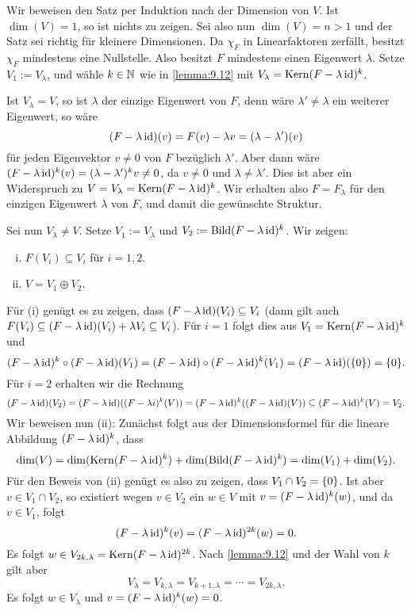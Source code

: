 \begin{beweis}
	Wir beweisen den Satz per Induktion nach der Dimension von $V$.
	Ist $\dim(V) = 1$, so ist nichts zu zeigen.
	Sei also nun $\dim(V) = n > 1$ und der Satz sei richtig für kleinere Dimensionen.
	Da $\chi_F$ in Linearfaktoren zerfällt, besitzt $\chi_F$ mindestens eine Nullstelle.
	Also besitzt $F$ mindestens einen Eigenwert $\lambda$.
	Setze $V_1 := V_\lambda$, und wähle $k \in \mathbb{N}$ wie in \autoref{lemma:9.12} mit $V_\lambda = \operatorname{Kern}(F - \lambda \operatorname{id})^k$.
	
	Ist $V_\lambda = V$, so ist $\lambda$ der einzige Eigenwert von $F$, denn wäre $\lambda' \neq \lambda$ ein weiterer Eigenwert, so wäre
	\[
		(F-\lambda \operatorname{id})(v) = F(v) - \lambda v = (\lambda - \lambda')(v)
	\]
	für jeden Eigenvektor $v \neq 0$ von $F$ bezüglich $\lambda'$.
	Aber dann wäre $(F-\lambda \operatorname{id})^k(v) = (\lambda - \lambda')^kv \neq 0$, da $v \neq 0$ und $\lambda \neq \lambda'$.
	Dies ist aber ein Widerspruch zu $V = V_\lambda = \operatorname{Kern}(F - \lambda \operatorname{id})^k$.
	Wir erhalten also $F = F_\lambda$ für den einzigen Eigenwert $\lambda$ von $F$, und damit die gewünschte Struktur.
	
	Sei nun $V_\lambda \neq V$.
	Setze $V_1 := V_\lambda$ und $V_2 := \operatorname{Bild}(F - \lambda \operatorname{id})^k$.
	Wir zeigen:
	\begin{enumerate}[(i)]
		\item $F(V_i) \subseteq V_i$ für $i = 1,2$.
		\item $V = V_1 \oplus V_2$.
	\end{enumerate}
	Für (i) genügt es zu zeigen, dass $(F - \lambda \operatorname{id})(V_i) \subseteq V_i$ (dann gilt auch $F(V_i) \subseteq (F-\lambda \operatorname{id})(V_i) + \lambda V_i \subseteq V_i$).
	Für $i = 1$ folgt dies aus $V_1 = \operatorname{Kern}(F - \lambda \operatorname{id})^k$ und
	\[
		(F-\lambda \operatorname{id})^k \circ (F-\lambda \operatorname{id})(V_1) = (F - \lambda \operatorname{id}) \circ (F - \lambda \operatorname{id})^k(V_1) = (F - \lambda \operatorname{id})(\{0\}) = \{0\}.
	\]
	Für $i = 2$ erhalten wir die Rechnung
	\[
		(F-\lambda \operatorname{id})(V_2) = (F-\lambda \operatorname{id})((F-\lambda i)^k(V)) = (F - \lambda \operatorname{id})^k((F - \lambda \operatorname{id})(V)) \subseteq (F-\lambda \operatorname{id})^k(V) = V_2.
	\]
	Wir beweisen nun (ii):
	Zunächst folgt aus der Dimensionsformel für die lineare Abbildung $(F-\lambda \operatorname{id})^k$, dass
	\[
		\dim(V) = \dim(\operatorname{Kern}(F - \lambda \operatorname{id})^k) + \dim(\operatorname{Bild}(F - \lambda \operatorname{id})^k) = \dim(V_1) + \dim(V_2).
	\]
	Für den Beweis von (ii) genügt es also zu zeigen, dass $V_1 \cap V_2 = \{0\}$.
	Ist aber $v \in V_1 \cap V_2$, so existiert wegen $v \in V_2$ ein $w \in V$ mit $v = (F-\lambda \operatorname{id})^k(w)$, und da $v \in V_1$, folgt
	\[
		(F- \lambda \operatorname{id})^k(v) = (F - \lambda \operatorname{id})^{2k}(w) = 0.
	\]
	Es folgt $w \in V_{2k,\lambda} = \operatorname{Kern}(F - \lambda \operatorname{id})^{2k}$.
	Nach \autoref{lemma:9.12} und der Wahl von $k$ gilt aber
	\[
		V_\lambda = V_{k,\lambda} = V_{k+1,\lambda} = \cdots = V_{2k,\lambda}.
	\]
	Es folgt $w \in V_{\lambda}$ und $v = (F - \lambda \operatorname{id})^{k}(w) = 0$.
	

\end{beweis}

